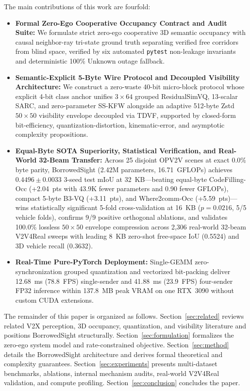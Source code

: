 \documentclass[journal]{IEEEtran}
\begin{document}
The main contributions of this work are fourfold:
\begin{itemize}
\item \textbf{Formal Zero-Ego Cooperative Occupancy Contract and Audit Suite:} We formulate strict zero-ego cooperative 3D semantic occupancy with causal neighbor-ray tri-state ground truth separating verified free corridors from blind space, verified by six automated \texttt{pytest} non-leakage invariants and deterministic 100\% Unknown outage fallback.
\item \textbf{Semantic-Explicit 5-Byte Wire Protocol and Decoupled Visibility Architecture:} We construct a zero-waste 40-bit micro-block protocol whose explicit 4-bit class anchor unifies $3\times 64$ grouped ResidualSimVQ, 13-scalar SARC, and zero-parameter SS-KFW alongside an adaptive 512-byte Zstd $50\times 50$ visibility envelope decoupled via TDVF, supported by closed-form bit-efficiency, quantization-distortion, kinematic-error, and asymptotic complexity propositions.
\item \textbf{Equal-Byte SOTA Superiority, Statistical Verification, and Real-World 32-Beam Transfer:} Across 25 disjoint OPV2V scenes at exact 0.0\% byte parity, BorrowedSight (2.42M parameters, 16.71~GFLOPs) achieves $0.4496 \pm 0.0033$ 3-seed test mIoU at 32~KB---beating equal-byte CodeFilling-Occ (+2.04~pts with 43.9K fewer parameters and 0.90 fewer GFLOPs), compact 5-byte B3-VQ (+3.11~pts), and Where2comm-Occ (+5.59~pts)---wins statistically significant 5-fold cross-validation at 16~KB ($p = 0.0216$, 5/5 vehicle folds), confirms 9/9 positive orthogonal ablations, and validates 100.0\% lossless $50\times 50$ envelope compression across 2,306 real-world 32-beam V2V4Real sweeps with leading 8~KB zero-shot free-space IoU (0.5524) and 3D vehicle recall (0.3632).
\item \textbf{Real-Time Pure-PyTorch Deployment:} Single-GEMM zero-synchronization grouped quantization and vectorized bit-packing deliver 12.68~ms (78.8~FPS) single-sender and 41.88~ms (23.9~FPS) four-sender FP32 inference within 137.8~MB peak VRAM on one RTX~3090 without custom CUDA extensions.
\end{itemize}

The remainder of this paper is organized as follows. Section~\ref{sec:related} reviews related V2X perception, 3D occupancy, quantization, and visibility literature and positions BorrowedSight structurally. Section~\ref{sec:formulation} formalizes the zero-ego system model and rate-constrained objective. Section~\ref{sec:method} details the BorrowedSight architecture and derives formal theoretical and complexity guarantees. Section~\ref{sec:experiments} presents multi-dataset benchmarks, ablations, internal mechanism audits, real-world V2V4Real validation, and compute profiling. Section~\ref{sec:conclusion} concludes the paper.
\end{document}
